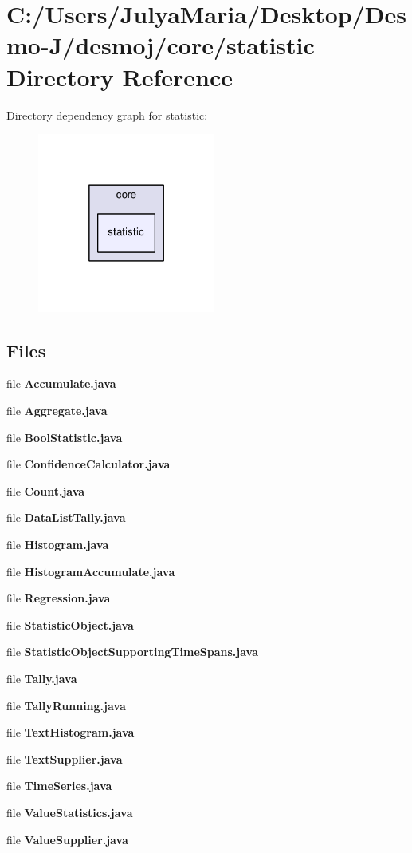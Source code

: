 \section{C\-:/\-Users/\-Julya\-Maria/\-Desktop/\-Desmo-\/\-J/desmoj/core/statistic Directory Reference}
\label{dir_7834d83f961704c6f43d780719e080b0}
Directory dependency graph for statistic\-:
\nopagebreak
\begin{figure}[H]
\begin{center}
\leavevmode
\includegraphics[width=166pt]{dir_7834d83f961704c6f43d780719e080b0_dep}
\end{center}
\end{figure}
\subsection*{Files}
\begin{DoxyCompactItemize}
\item 
file {\bfseries Accumulate.\-java}
\item 
file {\bfseries Aggregate.\-java}
\item 
file {\bfseries Bool\-Statistic.\-java}
\item 
file {\bfseries Confidence\-Calculator.\-java}
\item 
file {\bfseries Count.\-java}
\item 
file {\bfseries Data\-List\-Tally.\-java}
\item 
file {\bfseries Histogram.\-java}
\item 
file {\bfseries Histogram\-Accumulate.\-java}
\item 
file {\bfseries Regression.\-java}
\item 
file {\bfseries Statistic\-Object.\-java}
\item 
file {\bfseries Statistic\-Object\-Supporting\-Time\-Spans.\-java}
\item 
file {\bfseries Tally.\-java}
\item 
file {\bfseries Tally\-Running.\-java}
\item 
file {\bfseries Text\-Histogram.\-java}
\item 
file {\bfseries Text\-Supplier.\-java}
\item 
file {\bfseries Time\-Series.\-java}
\item 
file {\bfseries Value\-Statistics.\-java}
\item 
file {\bfseries Value\-Supplier.\-java}
\end{DoxyCompactItemize}
